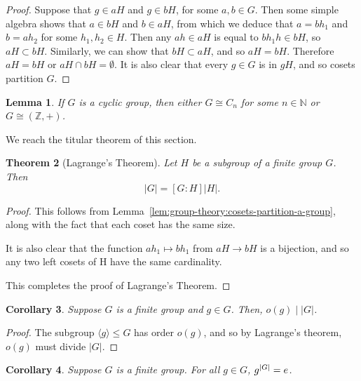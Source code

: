 \documentclass[12pt]{report}
\newcommand{\N}{\mathbb{N}}
\newcommand{\Z}{\mathbb{Z}}
\newcommand{\iso}{\cong}
\newtheorem{theorem}{Theorem}[section] %
\newtheorem{lemma}[theorem]{Lemma}
\newtheorem{corollary}[theorem]{Corollary}
\theoremstyle{definition}
\begin{document}
\begin{proof}
  Suppose that \(g \in aH\) and \(g \in bH\), for some \(a, b \in G\).
  Then some simple algebra shows that \(a \in bH\) and \(b \in aH\), from which we deduce that \(a = b h_{1}\) and \(b = a h_{2}\) for some \(h_{1}, h_{2} \in H\).
  Then any \(ah \in aH\) is equal to \(bh_{1}h \in bH\), so \(aH \subset bH\).
  Similarly, we can show that \(bH \subset aH\), and so \(aH = bH\).
  Therefore \(aH = bH\) or \(aH \cap bH = \emptyset\).
  It is also clear that every \(g \in G\) is in \(gH\), and so cosets partition \(G\).
\end{proof}

\begin{lemma}
  If \(G\) is a cyclic group, then either \(G \iso C_{n}\) for some \(n \in \N\) or \(G \iso (\Z, +)\).
\end{lemma}

We reach the titular theorem of this section.

\begin{theorem}[Lagrange's Theorem]\label{thm:group-theory:Lagranges-theorem}
  Let \(H\) be a subgroup of a finite group \(G\). Then
  \[|G| = [G : H]|H|.\]
\end{theorem}

\begin{proof}
  This follows from Lemma~\ref{lem:group-theory:cosets-partition-a-group}, along with the fact that each coset has the same size.

  It is also clear that the function \(ah_{1} \mapsto bh_{1}\)  from \(aH \to bH\) is a bijection, and so any two left cosets of H have the same cardinality.

  This completes the proof of Lagrange's Theorem.
\end{proof}



\begin{corollary}
\label{cor:group-theory:order-divides-group}
  Suppose \(G\) is a finite group and \(g \in G\).
  Then, \(o(g) \mid \left|G\right|\).
\end{corollary}

\begin{proof}
  The subgroup \(\langle g \rangle \leq G\) has order \(o(g)\), and so by Lagrange's theorem, \(o(g)\) must divide \(|G|\).
\end{proof}

\begin{corollary}
\label{cor:group-theory:g-to-power-of-group-order-is-e}
  Suppose \(G\) is a finite group.
  For all \(g \in G\), \(g^{\abs{G}} = e\).
\end{corollary}
\end{document}
